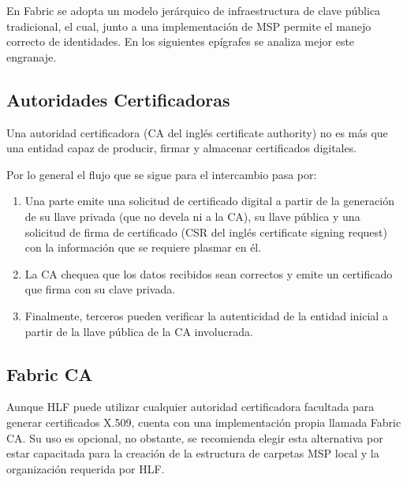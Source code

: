 En Fabric se adopta un modelo jer\'arquico de infraestructura de clave pública tradicional, el cual, junto a una implementaci\'on de MSP permite el manejo correcto de identidades. En los siguientes ep\'igrafes se analiza mejor este engranaje.

\subsection{Autoridades Certificadoras}
Una autoridad certificadora (CA del ingl\'es certificate authority) no es m\'as que una entidad capaz de producir, firmar y almacenar certificados digitales.

Por lo general el flujo que se sigue para el intercambio pasa por:

\begin{enumerate}
	\item Una parte emite una solicitud de certificado digital a partir de la generaci\'on de su llave privada (que no devela ni a la CA), su llave p\'ublica y una solicitud de firma de certificado (CSR del ingl\'es certificate signing request) con la informaci\'on que se requiere plasmar en \'el.
	
	\item La CA chequea que los datos recibidos sean correctos y emite un certificado que firma con su clave privada.
	
	\item Finalmente, terceros pueden verificar la autenticidad de la entidad inicial a partir de la llave p\'ublica de la CA involucrada.
\end{enumerate}


\subsection{Fabric CA}

Aunque HLF puede utilizar cualquier autoridad certificadora facultada para generar certificados X.509, cuenta con una implementaci\'on propia llamada Fabric CA. Su uso es opcional, no obstante, se recomienda elegir esta alternativa por estar capacitada para la creaci\'on de la estructura de carpetas MSP local y la organizaci\'on requerida por HLF.%

